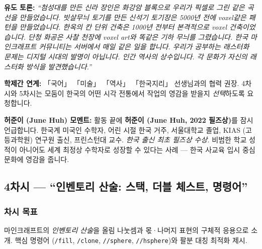 \documentclass[12pt,a4paper]{scrartcl}
\newcommand{\acc}[1]{\textcolor{accent}{\textbf{#1}}}
\newcommand{\cmd}[1]{\textcolor{earth}{\texttt{\small #1}}}
\newcommand{\tempo}[1]{\textnormal{\footnotesize\color{bg!90!white}\textsf{#1}}}
\begin{document}
\begin{hwaldong}[3.4 --- 한국 시각 유산과의 대화 \quad\tempo{10분}]
\textbf{유도 토론:} \emph{\enquote{첨성대를 만든 신라 장인은 화강암 블록으로 우리가 픽셀로 그린 같은 곡선을 만들었습니다. 빗살무늬 토기를 만든 신석기 토기장은 5000년 전에 voxel같은 패턴을 만들었습니다. 한옥의 칸 단위 건축은 1000년 전부터 본격적으로 voxel 건축이었습니다. 단청 화공은 사찰 천장에 voxel art와 똑같은 기하 무늬를 그렸습니다. 한국 마인크래프트 커뮤니티는 서버에서 매일 같은 일을 합니다. 우리가 공부하는 래스터화 문제는 디지털 시대의 발명이 아닙니다. 인간 역사의 상수입니다. 각 문화가 자신의 \emph{래스터화} 방식을 발견했습니다.}}

\textbf{학제간 연계:} 「국어」 「미술」 「역사」 「한국지리」 선생님과의 협력 권장. 4차시와 5차시는 모둠이 한국의 어떤 시각 전통에서 작업의 영감을 받을지 \emph{선택}하도록 요청합니다.

\textbf{허준이 (June Huh) 모멘트:} 활동 끝에 \acc{허준이 (June Huh, 2022 필즈상)}를 잠시 언급합니다. 한국계 미국인 수학자, 어린 시절 한국 거주, 서울대학교 졸업, KIAS (고등과학원) 연구원 출신, 프린스턴대 교수. \emph{한국 출신 최초 필즈상 수상.} 비범한 학교 성적이 아니어도 세계 최정상 수학자로 성장할 수 있다는 사례 — 한국 사교육 입시 중심 문화에 영감을 줍니다.
\end{hwaldong}

\subsection{4차시 --- \enquote{인벤토리 산술: 스택, 더블 체스트, 명령어}}\label{aula4}

\subsubsection*{차시 목표}
마인크래프트의 \emph{인벤토리 산술}을 올림 나눗셈과 몫·나머지 표현의 구체적 응용으로 소개. 핵심 명령어 (\cmd{/fill}, \cmd{/clone}, \cmd{//sphere}, \cmd{//hsphere})와 팔분 대칭 최적화 제시.
\end{document}
